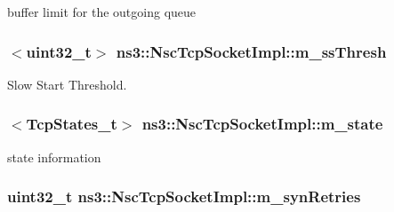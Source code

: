 buffer limit for the outgoing queue 

\subsubsection[{\texorpdfstring{m\+\_\+ss\+Thresh}{m_ssThresh}}]{$<$uint32\+\_\+t$>$ ns3\+::\+Nsc\+Tcp\+Socket\+Impl\+::m\+\_\+ss\+Thresh\hspace{0.3cm}{\ttfamily [private]}}\hypertarget{classns3_1_1NscTcpSocketImpl_a361628ab449ed7b557e4191ba0bef7db}{}\label{classns3_1_1NscTcpSocketImpl_a361628ab449ed7b557e4191ba0bef7db}


Slow Start Threshold. 

\subsubsection[{\texorpdfstring{m\+\_\+state}{m_state}}]{$<${\bf Tcp\+States\+\_\+t}$>$ ns3\+::\+Nsc\+Tcp\+Socket\+Impl\+::m\+\_\+state\hspace{0.3cm}{\ttfamily [private]}}\hypertarget{classns3_1_1NscTcpSocketImpl_aa60a97fe06f4b74ed57101a297d6216c}{}\label{classns3_1_1NscTcpSocketImpl_aa60a97fe06f4b74ed57101a297d6216c}


state information 

\subsubsection[{\texorpdfstring{m\+\_\+syn\+Retries}{m_synRetries}}]{\setlength{\rightskip}{0pt plus 5cm}uint32\+\_\+t ns3\+::\+Nsc\+Tcp\+Socket\+Impl\+::m\+\_\+syn\+Retries\hspace{0.3cm}{\ttfamily [private]}}\hypertarget{classns3_1_1NscTcpSocketImpl_a3729630b866ed2e25d7514729ec5e33f}{}\label{classns3_1_1NscTcpSocketImpl_a3729630b866ed2e25d7514729ec5e33f}


